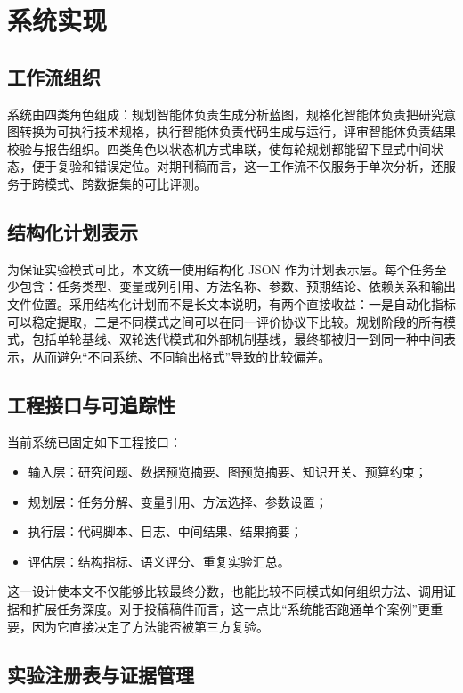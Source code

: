 \section{系统实现}

\subsection{工作流组织}

系统由四类角色组成：规划智能体负责生成分析蓝图，规格化智能体负责把研究意图转换为可执行技术规格，执行智能体负责代码生成与运行，评审智能体负责结果校验与报告组织。四类角色以状态机方式串联，使每轮规划都能留下显式中间状态，便于复验和错误定位。对期刊稿而言，这一工作流不仅服务于单次分析，还服务于跨模式、跨数据集的可比评测。

\subsection{结构化计划表示}

为保证实验模式可比，本文统一使用结构化 JSON 作为计划表示层。每个任务至少包含：任务类型、变量或列引用、方法名称、参数、预期结论、依赖关系和输出文件位置。采用结构化计划而不是长文本说明，有两个直接收益：一是自动化指标可以稳定提取，二是不同模式之间可以在同一评价协议下比较。规划阶段的所有模式，包括单轮基线、双轮迭代模式和外部机制基线，最终都被归一到同一种中间表示，从而避免“不同系统、不同输出格式”导致的比较偏差。

\subsection{工程接口与可追踪性}

当前系统已固定如下工程接口：

\begin{itemize}
  \item 输入层：研究问题、数据预览摘要、图预览摘要、知识开关、预算约束；
  \item 规划层：任务分解、变量引用、方法选择、参数设置；
  \item 执行层：代码脚本、日志、中间结果、结果摘要；
  \item 评估层：结构指标、语义评分、重复实验汇总。
\end{itemize}

这一设计使本文不仅能够比较最终分数，也能比较不同模式如何组织方法、调用证据和扩展任务深度。对于投稿稿件而言，这一点比“系统能否跑通单个案例”更重要，因为它直接决定了方法能否被第三方复验。

\subsection{实验注册表与证据管理}

